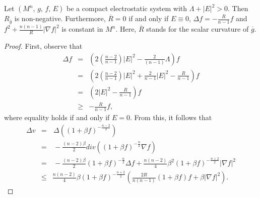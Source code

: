 \documentclass[10pt,a4paper]{amsart}
\begin{document}
	\begin{lemma}\label{posit_conf}
Let $(M^n,\,g,\,f,\,E)$ be a compact electrostatic system with $\Lambda+|E|^{2}>0$. Then $R_{\bar{g}}$ is non-negative. Furthermore, $\overline{R}=0$ if and only if $E\equiv 0$, $\Delta f=-\frac{R}{n-1}f$ and $f^{2}+\frac{n(n-1)}{R}|\nabla f|^{2}$ is constant in $M^n$. Here, $\overline{R}$ stands for the scalar curvature of $\overline{g}$.
	\end{lemma}

	\begin{proof}
		First, observe that
		\begin{eqnarray}
			\Delta f&=&\left(2\left(\frac{n-2}{n-1}\right)|E|^{2}-\frac{2}{(n-1)}\Lambda\right)f\nonumber\\
			&=&\left(2\left(\frac{n-2}{n-1}\right)|E|^{2}+\frac{2}{n-1}|E|^{2}-\frac{R}{n-1}\right)f\nonumber\\
			&=&\left(2|E|^{2}-\frac{R}{n-1}\right)f\nonumber\\
			&\geq & -\frac{R}{n-1}f, \label{ineq_el1}
		\end{eqnarray}
		where equality holds if and only if $E=0.$ From this, it follows that
		\begin{eqnarray}\nonumber
			\Delta v &=&\,\Delta\left((1+\beta f)^{-\frac{n-2}{2}}\right)\\\nonumber
			&=&\,-\frac{(n-2)\beta}{2}div\left((1+\beta f)^{-\frac{n}{2}}\nabla f\right)\\
			&=&\, -\frac{(n-2)\beta}{2}(1+\beta f)^{-\frac{n}{2}}\Delta f + \frac{n(n-2)}{4}\beta^2 (1+\beta f)^{-\frac{n+2}{2}}|\nabla f|^2\nonumber\\
			&\leq &\frac{n(n-2)}{4}\beta(1+\beta f)^{-\frac{n+2}{2}}\left(\frac{2R}{n(n-1)}(1+\beta f)f+\beta|\nabla f|^2\right). \label{ineq_el2}
		\end{eqnarray}
		
		
		

		
		

\end{proof}
\end{document}
